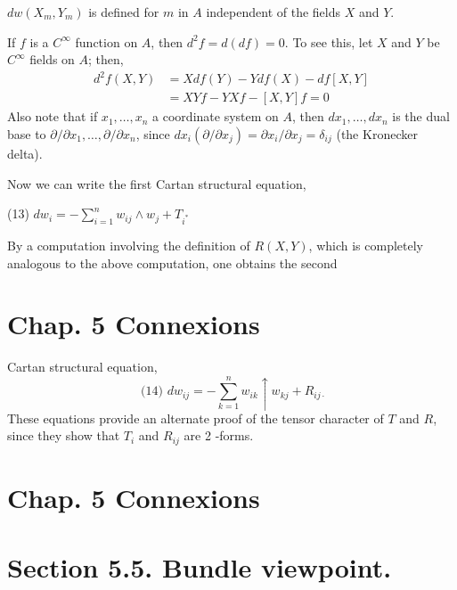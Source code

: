 \documentclass[10pt]{article}
\begin{document}
$d w\left(X_{m}, Y_{m}\right)$ is defined for $m$ in $A$ independent of the fields $X$ and $Y$.

If $f$ is a $C^{\infty}$ function on $A$, then $d^{2} f=d(d f)=0$. To see this, let $X$ and $Y$ be $C^{\infty}$ fields on $A$; then,
$$
\begin{aligned}
d^{2} f(X, Y) &=X d f(Y)-Y d f(X)-d f[X, Y] \\
&=X Y f-Y X f-[X, Y] f=0
\end{aligned}
$$
Also note that if $x_{1}, \ldots, x_{n}$ a coordinate system on $A$, then $d x_{1}, \ldots, d x_{n}$ is the dual base to $\partial / \partial x_{1}, \ldots, \partial / \partial x_{n}$, since $d x_{i}\left(\partial / \partial x_{j}\right)=\partial x_{i} / \partial x_{j}=\delta_{i j}$ (the Kronecker delta).

Now we can write the first Cartan structural equation,

(13) $d w_{i}=-\sum_{i=1}^{n} w_{i j} \wedge w_{j}+T_{i^{*}}$

By a computation involving the definition of $R(X, Y)$, which is completely analogous to the above computation, one obtains the second

\section{Chap. 5 Connexions}
Cartan structural equation,
$$
\text { (14) } d w_{i j}=-\sum_{k=1}^{n} w_{i k} \uparrow w_{k j}+R_{i j \cdot}
$$
These equations provide an alternate proof of the tensor character of $T$ and $R$, since they show that $T_{i}$ and $R_{i j}$ are 2 -forms.


\section{Chap. 5 Connexions}


\section{Section 5.5. Bundle viewpoint.}
\end{document}
